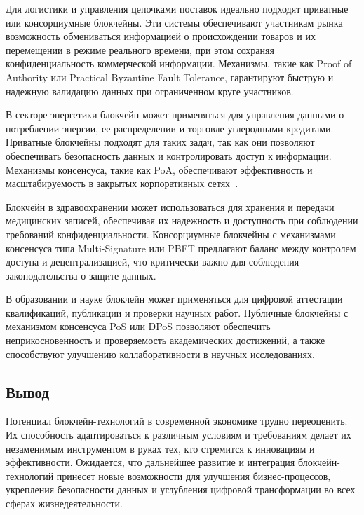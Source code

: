 \documentclass{mirea-article}
\begin{document}
Для логистики и управления цепочками поставок идеально подходят приватные или консорциумные блокчейны. Эти системы обеспечивают участникам рынка возможность обмениваться информацией о происхождении товаров и их перемещении в режиме реального времени, при этом сохраняя конфиденциальность коммерческой информации. Механизмы, такие как Proof of Authority или Practical Byzantine Fault Tolerance, гарантируют быструю и надежную валидацию данных при ограниченном круге участников.

В секторе энергетики блокчейн может применяться для управления данными о потреблении энергии, ее распределении и торговле углеродными кредитами. Приватные блокчейны подходят для таких задач, так как они позволяют обеспечивать безопасность данных и контролировать доступ к информации. Механизмы консенсуса, такие как PoA, обеспечивают эффективность и масштабируемость в закрытых корпоративных сетях~\cite[с. 174 --- 177]{bib:blckper}.

Блокчейн в здравоохранении может использоваться для хранения и передачи медицинских записей, обеспечивая их надежность и доступность при соблюдении требований конфиденциальности. Консорциумные блокчейны с механизмами консенсуса типа Multi-Signature или PBFT предлагают баланс между контролем доступа и децентрализацией, что критически важно для соблюдения законодательства о защите данных.

В образовании и науке блокчейн может применяться для цифровой аттестации квалификаций, публикации и проверки научных работ. Публичные блокчейны с механизмом консенсуса PoS или DPoS позволяют обеспечить неприкосновенность и проверяемость академических достижений, а также способствуют улучшению коллаборативности в научных исследованиях.

\subsection*{Вывод}

Потенциал блокчейн-технологий в современной экономике трудно переоценить. Их способность адаптироваться к различным условиям и требованиям делает их незаменимым инструментом в руках тех, кто стремится к инновациям и эффективности. Ожидается, что дальнейшее развитие и интеграция блокчейн-технологий принесет новые возможности для улучшения бизнес-процессов, укрепления безопасности данных и углубления цифровой трансформации во всех сферах жизнедеятельности.
\end{document}
